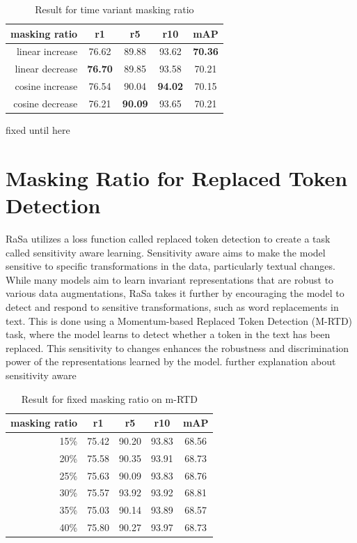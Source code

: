 \begin{table}[htbp]
  \centering
  \caption{Result for time variant masking ratio}
  \begin{tabular}{rcccc}
    \centering
    masking ratio & r1 & r5 & r10 & mAP\\ \hline
    linear increase & 76.62 & 89.88 & 93.62 & \textbf{70.36} \\
    linear decrease & \textbf{76.70} & 89.85 & 93.58 & 70.21 \\
    cosine increase & 76.54 & 90.04 & \textbf{94.02} & 70.15 \\
    cosine decrease & 76.21 & \textbf{90.09} & 93.65 & 70.21 \\
  \end{tabular}
\end{table}

{\color{red} fixed until here}
\section{Masking Ratio for Replaced Token Detection}
RaSa utilizes a loss function called replaced token detection to create a task called sensitivity aware learning.
Sensitivity aware aims to make the model sensitive to specific transformations in the data, particularly textual changes. While many models aim to learn invariant representations that are robust to various data augmentations, RaSa takes it further by encouraging the model to detect and respond to sensitive transformations, such as word replacements in text. This is done using a Momentum-based Replaced Token Detection (M-RTD) task, where the model learns to detect whether a token in the text has been replaced. This sensitivity to changes enhances the robustness and discrimination power of the representations learned by the model.
{\color{red}further explanation about sensitivity aware}


\begin{table}[htbp]
  \centering
  \caption{Result for fixed masking ratio on m-RTD}
  \begin{tabular}{rcccc}
    masking ratio & r1 & r5 & r10 & mAP \\ \hline
    15\% & 75.42 & 90.20 & 93.83 & 68.56 \\
    20\% & 75.58 & 90.35 & 93.91 & 68.73 \\
    25\% & 75.63 & 90.09 & 93.83 & 68.76 \\
    30\% & 75.57 & 93.92 & 93.92 & 68.81 \\
    35\% & 75.03 & 90.14 & 93.89 & 68.57 \\
    40\% & 75.80 & 90.27 & 93.97 & 68.73
  \end{tabular}
\end{table}


